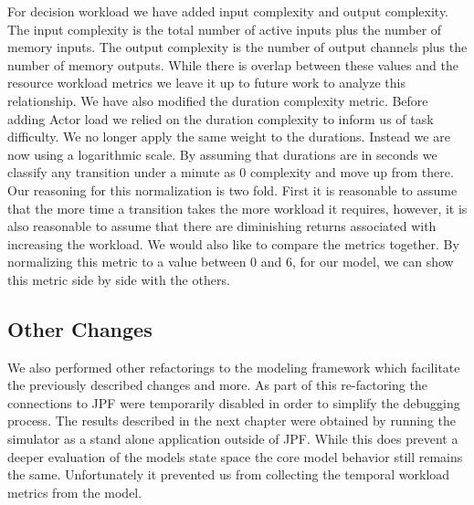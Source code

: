 For decision workload we have added input complexity and output complexity.  The input complexity is the total number of active inputs plus the number of memory inputs.  The output complexity is the number of output channels plus the number of memory outputs.  While there is overlap between these values and the resource workload metrics we leave it up to future work to analyze this relationship.  We have also modified the duration complexity metric.  Before adding Actor load we relied on the duration complexity to inform us of task difficulty.  We no longer apply the same weight to the durations.  Instead we are now using a logarithmic scale.  By assuming that durations are in seconds we classify any transition under a minute as 0 complexity and move up from there.  Our reasoning for this normalization is two fold.  First it is reasonable to assume that the more time a transition takes the more workload it requires, however, it is also reasonable to assume that there are diminishing returns associated with increasing the workload.  We would also like to compare the metrics together.  By normalizing this metric to a value between 0 and 6, for our model, we can show this metric side by side with the others.  


\subsection{Other Changes}
We also performed other refactorings to the modeling framework which facilitate the previously described changes and more.  As part of this re-factoring the connections to JPF were temporarily disabled in order to simplify the debugging process.  The results described in the next chapter were obtained by running the simulator as a stand alone application outside of JPF.  While this does prevent a deeper evaluation of the models state space the core model behavior still remains the same.  Unfortunately it prevented us from collecting the temporal workload metrics from the model.
